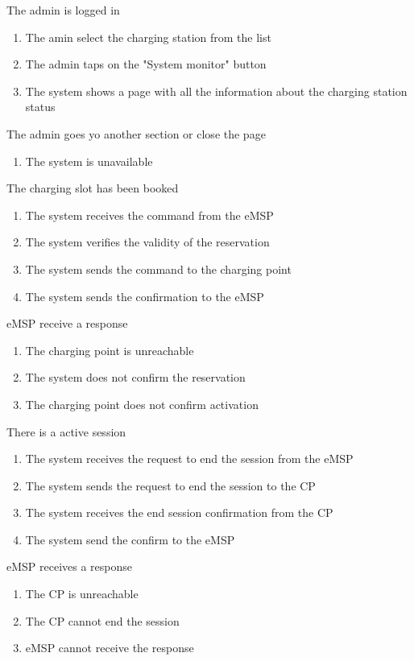 \begin{enumerate}
	
	{The admin is logged in }
	{
	\begin{enumerate}[1.]
	\item The amin select the charging station from the list
	\item The admin taps on the "System monitor" button
	\item The system shows a page with all the information about the charging station status
	\end{enumerate}
	}
	{The admin goes yo another section or close the page}
	{
	\begin{enumerate}[1.]
	\item The system is unavailable
	\end{enumerate}
	}
	
	{The charging slot has been booked}
	{
	\begin{enumerate}[1.]
	\item The system receives the command from the eMSP
	\item The system verifies the validity of the reservation
	\item The system sends the command to the charging point
	\item The system sends the confirmation to the eMSP
	\end{enumerate}
	}
	{eMSP receive a response}
	{
	\begin{enumerate}[1.]
	\item The charging point is unreachable
	\item The system does not confirm the reservation
	\item The charging point does not confirm activation
	\end{enumerate}
	}
	
	{There is a active session }
	{
	\begin{enumerate}[1.]
	\item The system receives the request to end the session from the eMSP
	\item The system sends the request to end the session to the CP
	\item The system receives the end session confirmation from the CP
	\item The system send the confirm to the eMSP
	\end{enumerate}
	}
	{eMSP receives a response}
	{
	\begin{enumerate}[1.]
	\item The CP is unreachable
	\item The CP cannot end the session
	\item eMSP cannot receive the response
	\end{enumerate}
	}
	

\end{enumerate}
